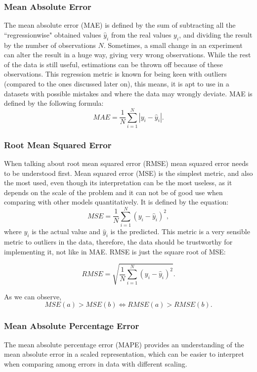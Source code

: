 \subsubsection{Mean Absolute Error}
The mean absolute error (MAE) is defined by the sum of subtracting all the ``regressionwise" obtained values $\hat{y}_i$ from the real values $y_i$, and dividing the result by the number of observations $N$. Sometimes, a small change in an experiment can alter the result in a huge way, giving very wrong observations. While the rest of the data is still useful, estimations can be thrown off because of these observations. This regression metric is known for being keen with outliers (compared to the ones discussed later on), this means, it is apt to use in a datasets with possible mistakes and where the data may wrongly deviate. MAE is defined by the following formula:
\begin{equation}
  MAE=\frac{1}{N}\sum_{i=1}^N|y_i-\hat{y}_i|.  
\end{equation}
\subsubsection{Root Mean Squared Error}
When talking about root mean squared error (RMSE) mean squared error needs to be understood first. Mean squared error (MSE) is the simplest metric, and also the most used, even though its interpretation can be the most useless, as it depends on the scale of the problem and it can not be of good use when comparing with other models quantitatively. It is defined by the equation:
\begin{equation}
MSE=\frac{1}{N}\sum_{i=1}^N(y_i-\hat{y}_i)^2,
\end{equation}
where $y_i$ is the actual value and $\hat{y}_i$ is the predicted.
This metric is a very sensible metric to outliers in the data, therefore, the data should be trustworthy for implementing it, not like in MAE. RMSE is just the square root of MSE:

\begin{equation}
RMSE=\sqrt{\frac{1}{N}\sum_{i=1}^N(y_i-\hat{y}_i)^2}.
\end{equation}

As we can observe, 
$$
MSE(a)>MSE(b)\Longleftrightarrow RMSE(a)>RMSE(b).
$$

\subsubsection{Mean Absolute Percentage Error}
The mean absolute percentage error (MAPE) provides an understanding of the mean absolute error in a scaled representation, which can be easier to interpret when comparing among errors in data with different scaling.

